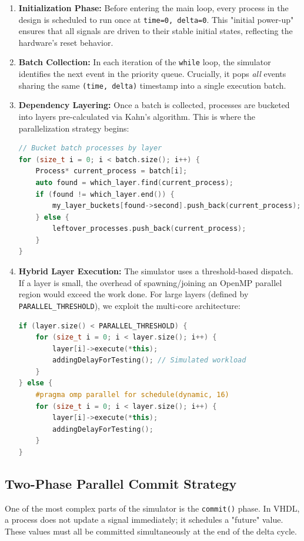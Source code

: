 \documentclass[9pt,a4paper]{article}
\begin{document}
\begin{enumerate}[leftmargin=1.5em]
    \item \textbf{Initialization Phase:} Before entering the main loop, every process in the design is scheduled to run once at \texttt{time=0, delta=0}. This "initial power-up" ensures that all signals are driven to their stable initial states, reflecting the hardware's reset behavior.
    \item \textbf{Batch Collection:} In each iteration of the \texttt{while} loop, the simulator identifies the next event in the priority queue. Crucially, it pops \textit{all} events sharing the same \texttt{(time, delta)} timestamp into a single execution batch.
    \item \textbf{Dependency Layering:} Once a batch is collected, processes are bucketed into layers pre-calculated via Kahn's algorithm. This is where the parallelization strategy begins:
    \begin{lstlisting}[language=C++]
// Bucket batch processes by layer
for (size_t i = 0; i < batch.size(); i++) {
    Process* current_process = batch[i];
    auto found = which_layer.find(current_process);
    if (found != which_layer.end()) {
        my_layer_buckets[found->second].push_back(current_process);
    } else {
        leftover_processes.push_back(current_process);
    }
}
    \end{lstlisting}
    \item \textbf{Hybrid Layer Execution:} The simulator uses a threshold-based dispatch. If a layer is small, the overhead of spawning/joining an OpenMP parallel region would exceed the work done. For large layers (defined by \texttt{PARALLEL\_THRESHOLD}), we exploit the multi-core architecture:
    \begin{lstlisting}[language=C++]
if (layer.size() < PARALLEL_THRESHOLD) {
    for (size_t i = 0; i < layer.size(); i++) {
        layer[i]->execute(*this);
        addingDelayForTesting(); // Simulated workload
    }
} else {
    #pragma omp parallel for schedule(dynamic, 16)
    for (size_t i = 0; i < layer.size(); i++) {
        layer[i]->execute(*this);
        addingDelayForTesting();
    }
}
    \end{lstlisting}
\end{enumerate}

\subsection{Two-Phase Parallel Commit Strategy}
One of the most complex parts of the simulator is the \texttt{commit()} phase. In VHDL, a process does not update a signal immediately; it schedules a "future" value. These values must all be committed simultaneously at the end of the delta cycle.
\end{document}
